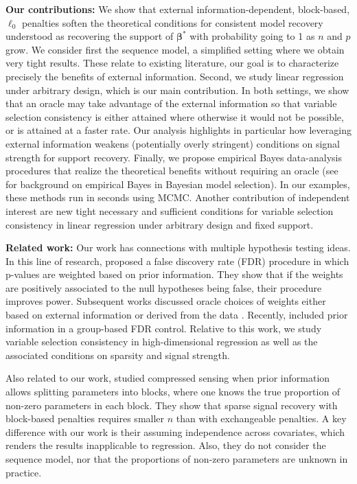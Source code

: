 \documentclass[bj,authoryear]{imsart}
\theoremstyle{plain}
\newcommand{\bs}{\boldsymbol}
\begin{document}
\noindent \textbf{Our contributions:} 
We show that external information-dependent, block-based, $\ell_0$ penalties soften the theoretical conditions for consistent model recovery understood as recovering the support of $\bs \beta^*$ %
with probability going to 1 as $n$ and $p$ grow. We consider first the sequence model, a simplified setting where we obtain very tight results. %
These relate to existing literature, our goal is to characterize precisely the benefits of external information.
Second, we study 
linear regression under arbitrary design, which is our main contribution. In both settings, we
show that an oracle may take advantage of the external information %
so that variable selection consistency is either attained where otherwise it would not be possible, or is attained at a faster rate. Our analysis highlights in particular how leveraging external information weakens (potentially overly stringent) conditions on signal strength for support recovery.
Finally, we propose empirical Bayes data-analysis  %
procedures that realize the theoretical benefits without requiring an oracle
(see \cite{petrone:2014,castillo2020spike} for background on empirical Bayes in Bayesian model selection). 
In our examples, these methods run in seconds using MCMC. Another contribution of independent interest are new tight necessary and sufficient conditions for variable selection consistency in linear regression under arbitrary design and fixed support.
\smallskip

\noindent \textbf{Related work:} Our work has connections with multiple hypothesis testing ideas. In this line of research, \cite{genovese2006} proposed a false discovery rate (FDR) procedure in which p-values are weighted based on prior information. They show that if the weights are positively associated to the null hypotheses being false, their procedure improves power. Subsequent works discussed oracle choices of weights either based on external information or derived from the data \citep{roederwasserman,basu}. Recently, \cite{ramdas2019prior} included prior information in a group-based FDR control. 
Relative to this work, we study variable selection consistency in high-dimensional regression as well as the associated conditions on sparsity and signal strength.

Also related to our work, \cite{scarlett2012compressed} studied compressed sensing when prior information allows splitting parameters into blocks, where one knows the true proportion of non-zero parameters in each block. They show that sparse signal recovery with block-based penalties requires smaller $n$ than with exchangeable penalties. A key difference with our work is their assuming independence across covariates, which renders the results inapplicable to regression. Also, they do not consider the sequence model, nor that the proportions of non-zero parameters are unknown in practice.
\smallskip
\end{document}
